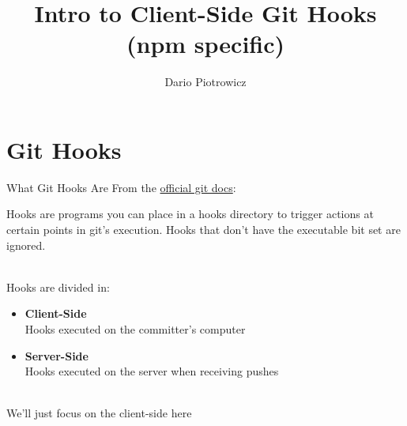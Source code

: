 \documentclass[11pt]{beamer}
\author{Dario Piotrowicz}
\title{Intro to Client-Side Git Hooks (npm specific)}
\begin{document}
\begin{frame}
\titlepage
\end{frame}

\begin{frame}
 \tableofcontents
\end{frame}


\section{Git Hooks}

\begin{frame}{What Git Hooks Are}
  From the
  {\color{purple} \href{https://git-scm.com/docs/githooks\#_description}{official git docs}}:

  \begin{definition}
    Hooks are programs you can place in a hooks directory to trigger actions at certain points in git’s execution. Hooks that don’t have the executable bit set are    ignored.
  \end{definition}
  ~\\
  Hooks are divided in:
  \begin{itemize}
    \item \textbf{Client-Side} \\
  		Hooks executed on the committer's computer
    \item \textbf{Server-Side} \\
        Hooks executed on the server when receiving pushes
  \end{itemize}
  ~\\
  We'll just focus on the client-side here
\end{frame}
\end{document}
